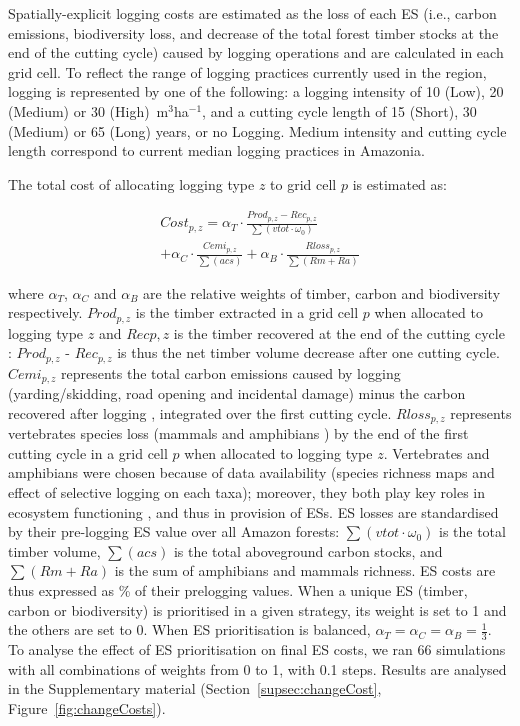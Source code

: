 \documentclass{article}
\begin{document}
Spatially-explicit logging costs are estimated as the loss of each ES (i.e., carbon emissions, biodiversity loss, and decrease of the total forest timber stocks at the end of the cutting cycle) caused by logging operations and are calculated in each grid cell. To reflect the range of logging practices currently used in the region, logging is represented by one of the following: a logging intensity of 10 (Low), 20 (Medium) or 30 (High)~m$^3$ha$^{−1}$, and a cutting cycle length of 15 (Short), 30 (Medium) or 65 (Long) years, or no Logging. Medium intensity and cutting cycle length correspond to current median logging practices in Amazonia.

The total cost of allocating logging type $z$ to grid cell $p$ is estimated as: 

\begin{equation}
\begin{split}
    Cost_{p,z} = \alpha _T \cdot \frac{Prod_{p,z} - Rec_{p,z}}{\sum(vtot\cdot \omega_0)} \\+ \alpha _C \cdot \frac{Cemi_{p,z}}{\sum (acs) }  + \alpha _B \cdot \frac{Rloss_{p,z}}{\sum (Rm + Ra)} 
\end{split}
\end{equation}

where $\alpha_T$, $\alpha_C$ and $\alpha_B$ are the relative weights of timber, carbon and biodiversity respectively. $Prod_{p,z}$ is the timber extracted in a grid cell $p$ when allocated to logging type $z$ and $Recp,z$ is the timber recovered at the end of the cutting cycle \cite{Piponiot2019}:  $Prod_{p,z}$ - $Rec_{p,z}$ is thus the net timber volume decrease after one cutting cycle. $Cemi_{p,z}$ represents the total carbon emissions caused by logging (yarding/skidding, road opening and incidental damage) minus the carbon recovered after logging \cite{Piponiot2016,Piponiot2016a}, integrated over the first cutting cycle. $Rloss_{p,z}$ represents vertebrates species loss (mammals and amphibians \cite{Jenkins2013}) by the end of the first cutting cycle in a grid cell $p$ when allocated to logging type $z$. Vertebrates and amphibians were chosen because of data availability (species richness maps and effect of selective logging on each taxa); moreover, they both play key roles in ecosystem functioning \cite{Wright2000,Fleming2009,Valencia-Aguilar2013}, and thus in provision of ESs.  
ES losses are standardised by their pre-logging ES value over all Amazon forests: $\sum(vtot\cdot \omega_0)$ is the total timber volume, $\sum (acs)$ is the total aboveground carbon stocks, and $\sum (Rm + Ra)$ is the sum of amphibians and mammals richness. ES costs are thus expressed as \% of their prelogging values. 
When a unique ES (timber, carbon or biodiversity) is prioritised in a given strategy, its weight is set to 1 and the others are set to 0. When ES prioritisation is balanced, $\alpha_T = \alpha_C = \alpha_B = \frac{1}{3}$.
To analyse the effect of ES prioritisation on final ES costs, we ran 66 simulations with all combinations of weights from 0 to 1, with 0.1 steps. Results are analysed in the Supplementary material (Section~\ref{supsec:changeCost}, Figure~\ref{fig:changeCosts}). 
\end{document}

